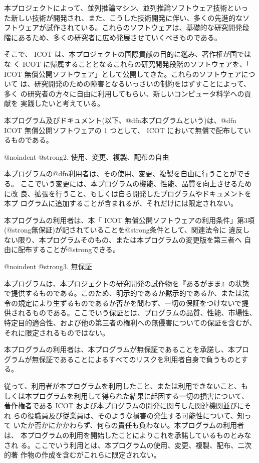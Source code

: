 本プロジェクトによって、並列推論マシン、並列推論ソフトウェア技術といっ
た新しい技術が開発され、また、こうした技術開発に伴い、多くの先進的なソ
フトウェアが試作されている。これらのソフトウェアは、基礎的な研究開発段
階にあるため、多くの研究者に広め発展させていくべきものである。

そこで、 ICOT は、本プロジェクトの国際貢献の目的に鑑み、著作権が国ではな
く ICOT に帰属することとなるこれらの研究開発段階のソフトウェアを、「 ICOT 
無償公開ソフトウェア」として公開してきた。これらのソフトウェアについて
は、研究開発のための障害となるいっさいの制約をはずすことによって、多く
の研究者の方々に自由に利用してもらい、新しいコンピュータ科学への貢献を
実践したいと考えている。

本プログラム及びドキュメント(以下、@dfn{本プログラム}という)は、@dfn{ ICOT 
無償公開ソフトウェア}の 1 つとして、 ICOT において無償で配布しているものである。

@noindent
@strong{2. 使用、変更、複製、配布の自由}

本プログラムの@dfn{利用者}は、その使用、変更、複製を自由に行うことができる。
ここでいう変更には、本プログラムの機能、性能、品質を向上させるために改
良、拡張を行うこと、もしくは自ら開発したプログラムやドキュメントを本プ
ログラムに追加することが含まれるが、それだけには限定されない。

本プログラムの利用者は、本「 ICOT 無償公開ソフトウェアの利用条件」第3項
(@strong{無保証})が記されていることを@strong{条件として}、関連法令に
違反しない限り、本プログラムそのもの、または本プログラムの変更版を第三者へ
自由に配布することが@strong{できる}。

@noindent
@strong{3. 無保証}

本プログラムは、本プロジェクトの研究開発の試作物を『あるがまま』の状態
で提供するものである。このため、明示的であるか黙示的であるか、または法
令の規定により生ずるものであるか否かを問わず、一切の保証をつけないで提
供されるものである。ここでいう保証とは、プログラムの品質、性能、市場性、
特定目的適合性、および他の第三者の権利への無侵害についての保証を含むが、
それに限定されるものではない。

本プログラムの利用者は、本プログラムが無保証であることを承諾し、本プロ
グラムが無保証であることによるすべてのリスクを利用者自身で負うものとす
る。

従って、利用者が本プログラムを利用したこと、または利用できないこと、も
しくは本プログラムを利用して得られた結果に起因する一切の損害について、
著作権者である ICOT および本プログラムの開発に関与した関連機関並びにそれ
らの役職員及び従業員は、そのような損害の発生する可能性について、知って
いたか否かにかかわらず、何らの責任も負わない。本プログラムの利用者は、
本プログラムの利用を開始したことによりこれを承諾しているものとみなされ
る。ここでいう利用とは、本プログラムの使用、変更、複製、配布、二次的著
作物の作成を含むがこれらに限定されない。

